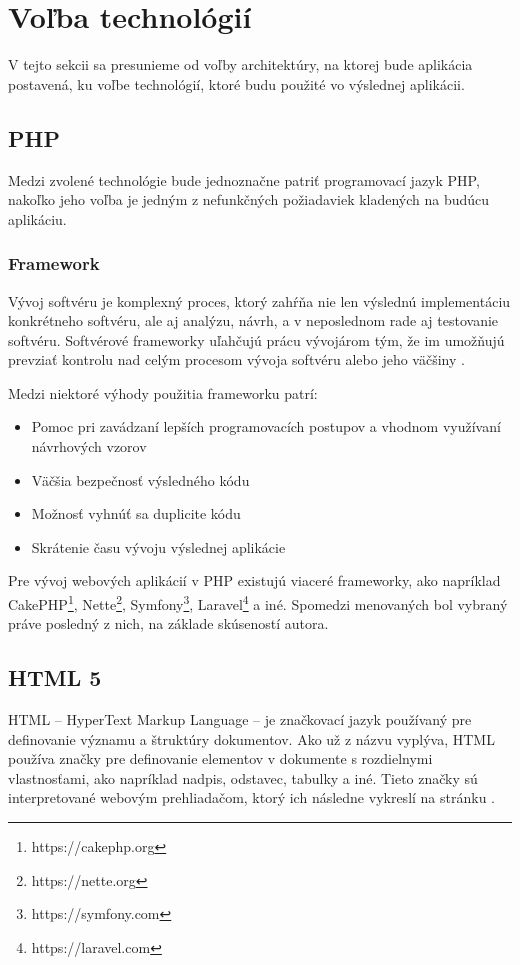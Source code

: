 \section{Voľba technológií}
V tejto sekcii sa presunieme od voľby architektúry, na ktorej bude aplikácia postavená, ku voľbe technológií, ktoré budu použité vo výslednej aplikácii.

\subsection{PHP}
Medzi zvolené technológie bude jednoznačne patriť programovací jazyk PHP, nakoľko jeho voľba je jedným z nefunkčných požiadaviek kladených na budúcu aplikáciu. 

\subsubsection*{Framework}
Vývoj softvéru je komplexný proces, ktorý zahŕňa nie len výslednú implementáciu konkrétneho softvéru, ale aj analýzu, návrh, a v neposlednom rade aj testovanie softvéru. Softvérové frameworky uľahčujú prácu vývojárom tým, že im umožňujú prevziať kontrolu nad celým procesom vývoja softvéru alebo jeho väčšiny \cite{co-je-framework}.

Medzi niektoré výhody použitia frameworku patrí:

\begin{itemize}
	\item Pomoc pri zavádzaní lepších programovacích postupov a vhodnom využívaní návrhových vzorov
	\item Väčšia bezpečnosť výsledného kódu
	\item Možnosť vyhnúť sa duplicite kódu
	\item Skrátenie času vývoju výslednej aplikácie
\end{itemize}

Pre vývoj webových aplikácií v PHP existujú viaceré frameworky, ako napríklad CakePHP\footnote{https://cakephp.org}, Nette\footnote{https://nette.org}, Symfony\footnote{https://symfony.com}, Laravel\footnote{https://laravel.com} a iné.
Spomedzi menovaných bol vybraný práve posledný z nich, na základe skúseností autora.

\subsection{HTML 5}
HTML -- HyperText Markup Language -- je značkovací jazyk používaný pre definovanie významu a štruktúry dokumentov. Ako už z názvu vyplýva, HTML používa značky pre definovanie elementov v dokumente s rozdielnymi vlastnosťami, ako napríklad nadpis, odstavec, tabulky a iné.
Tieto značky sú interpretované webovým prehliadačom, ktorý ich následne vykreslí na stránku \cite{co-je-html}.

